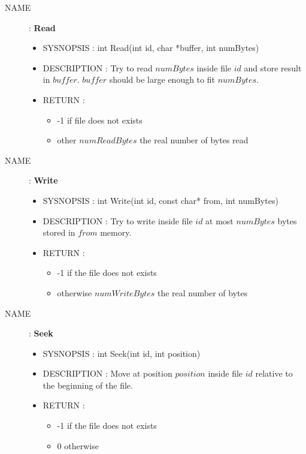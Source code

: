 \begin{description}
            \item [NAME] : \textbf{Read}
                \begin{itemize}
                    \item SYSNOPSIS : int Read(int id, char *buffer, int numBytes)
                    \item DESCRIPTION :
                        Try to read $numBytes$ inside file $id$ and store result in $buffer$.
                        $buffer$ should be large enough to fit $numBytes$.
                    \item RETURN :
                        \begin{itemize}
                            \item -1 if file does not exists
                            \item other $numReadBytes$ the real number of bytes read
                        \end{itemize}
                \end{itemize}

            \item [NAME] : \textbf{Write}
                \begin{itemize}
                    \item SYSNOPSIS : int Write(int id, const char* from, int numBytes)
                    \item DESCRIPTION :
                        Try to write inside file $id$ at most $numBytes$ bytes stored in $from$
                        memory.
                    \item RETURN :
                        \begin{itemize}
                            \item -1 if the file does not exists
                            \item otherwise $numWriteBytes$ the real number of bytes
                        \end{itemize}
                \end{itemize}

            \item [NAME] : \textbf{Seek}
                \begin{itemize}
                    \item SYSNOPSIS : int Seek(int id, int position)
                    \item DESCRIPTION :
                        Move at position $position$ inside file $id$ relative to the beginning of
                        the file.
                    \item RETURN :
                        \begin{itemize}
                            \item -1 if the file does not exists
                            \item 0 otherwise
                        \end{itemize}
                \end{itemize}


\end{description}
